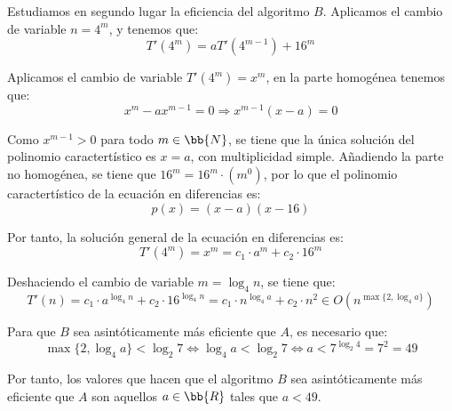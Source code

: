 \begin{ejercicio}
    Estudiamos en segundo lugar la eficiencia del algoritmo $B$.
    Aplicamos el cambio de variable $n=4^m$, y tenemos que:
    \begin{equation*}
        T'(4^m)=aT'\left(4^{m-1}\right) + 16^m
    \end{equation*}

    Aplicamos el cambio de variable $T'(4^m)=x^m$, en la parte homogénea tenemos que:
    \begin{equation*}
        x^m - ax^{m-1} = 0 \Longrightarrow x^{m-1}(x-a)=0
    \end{equation*}

    Como $x^{m-1}>0$ para todo $m\in \bb{N}$, se tiene que la única solución del polinomio caractertístico es $x=a$,
    con multiplicidad simple. Añadiendo la parte no homogénea, se tiene que $16^m = 16^m\cdot (m^0)$, por lo que el polinomio caractertístico
    de la ecuación en diferencias es:
    \begin{equation*}
        p(x) = (x-a)(x-16)
    \end{equation*}

    Por tanto, la solución general de la ecuación en diferencias es:
    \begin{equation*}
        T'(4^m) = x^m = c_1\cdot a^m + c_2\cdot 16^m
    \end{equation*}

    Deshaciendo el cambio de variable $m=\log_4 n$, se tiene que:
    \begin{equation*}
        T'(n) = c_1\cdot a^{\log_4 n} + c_2\cdot 16^{\log_4 n} = c_1\cdot n^{\log_4 a} + c_2\cdot n^2 \in O\left(n^{\max\{2, \log_4 a\}}\right)
    \end{equation*}

    Para que $B$ sea asintóticamente más eficiente que $A$, es necesario que:
    \begin{equation*}
        \max\{2, \log_4 a\} < \log_2 7 \Longleftrightarrow \log_4 a < \log_2 7 \Longleftrightarrow a < 7^{\log_2 4} = 7^2 = 49
    \end{equation*}

    Por tanto, los valores que hacen que el algoritmo $B$ sea asintóticamente más eficiente que $A$ son aquellos $a\in \bb{R}$ tales que $a<49$.
\end{ejercicio}



